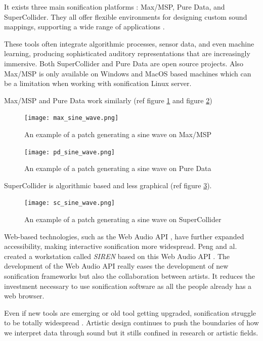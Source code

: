It exists three main sonification platforms : Max/MSP, Pure Data, and SuperCollider. They all offer flexible environments for designing custom sound mappings, supporting a wide range of applications \cite{puckettePureDataAnother}\cite{mccartneyRethinkingComputerMusic2002}.

These tools often integrate algorithmic processes, sensor data, and even machine learning, producing sophisticated auditory representations that are increasingly immersive.
Both SuperCollider and Pure Data are open source projects. Also Max/MSP is only available on Windows and MacOS based machines which can be a limitation when working with sonification Linux server.

Max/MSP and Pure Data work similarly (ref figure \ref{fig:max_sine_wave} and figure \ref{fig:pd_sine_wave})

\begin{figure}[h]
    \centering
    \texttt{[image: max\_sine\_wave.png]}
    \caption{An example of a patch generating a sine wave on Max/MSP}
    \vspace{0.1cm}
    \label{fig:max_sine_wave}
\end{figure}
\begin{figure}[h]
    \centering
    \texttt{[image: pd\_sine\_wave.png]}
    \caption{An example of a patch generating a sine wave on Pure Data}
    \vspace{0.1cm}
    \label{fig:pd_sine_wave}
\end{figure}

SuperCollider is algorithmic based and less graphical (ref figure \ref{fig:sc_sine_wave}).

\begin{figure}[h]
    \centering
    \texttt{[image: sc\_sine\_wave.png]}
    \caption{An example of a patch generating a sine wave on SuperCollider}
    \vspace{0.1cm}
    \label{fig:sc_sine_wave}
\end{figure}



Web-based technologies, such as the Web Audio API \cite{smus2013web}, have further expanded accessibility, making interactive sonification more widespread. Peng and al. created a workstation called \textit{SIREN} based on this Web Audio API \cite{pengSIRENCaseStudy2021}. The development of the Web Audio API really eases the development of new sonification frameworks but also the collaboration between artists. It reduces the investment necessary to use sonification software as all the people already has a web browser.

Even if new tools are emerging or old tool getting upgraded, sonification struggle to be totally widespread \cite{neuhoffSonificationDoomedFail2019}. Artistic design continues to push the boundaries of how we interpret data through sound but it stills confined in research or artistic fields.